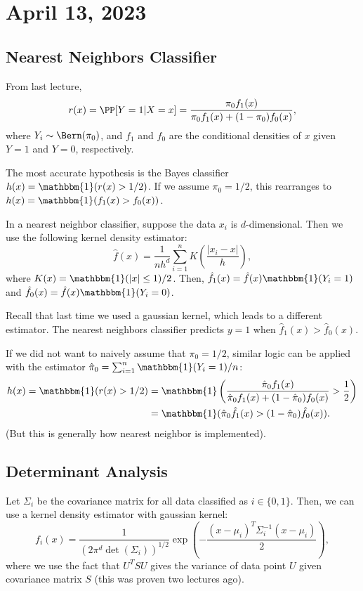 \section{April 13, 2023}

\subsection{Nearest Neighbors Classifier}

From last lecture, 
\[r(x) = \PP[Y=1|X=x] = \frac{\pi_0f_1(x)}{\pi_0f_1(x) + (1-\pi_0)f_0(x)},\]
where $Y_i\sim \Bern(\pi_0)$, and $f_1$ and $f_0$ are the conditional densities of $x$ given $Y=1$ and $Y=0$, respectively. 

The most accurate hypothesis is the Bayes classifier $h(x) = \mathbbm{1}(r(x) > 1/2)$. If we assume $\pi_0=1/2$, this rearranges to $h(x) = \mathbbm{1}(f_1(x) > f_0(x))$. 

\begin{definition}

In a nearest neighbor classifier, suppose the data $x_i$ is $d$-dimensional. Then we use the following kernel density estimator:
\[\hat{f}(x) = \frac{1}{nh^d}\sum_{i=1}^nK\left(\frac{\vert x_i-x\vert}{h}\right),\]
where $K(x) = \mathbbm{1}(\vert x\vert \leq 1)/2$. Then, $\hat{f}_1(x) = \hat{f}(x)\mathbbm{1}(Y_i=1)$ and $\hat{f}_0(x) = \hat{f}(x)\mathbbm{1}(Y_i=0)$. 
\end{definition}
Recall that last time we used a gaussian kernel, which leads to a different estimator. The nearest neighbors classifier predicts $y=1$ when $\hat{f}_1(x) > \hat{f}_0(x)$. 

If we did not want to naively assume that $\pi_0=1/2$, similar logic can be applied with the estimator $\hat{\pi}_0 = \sum_{i=1}^n\mathbbm{1}(Y_i=1)/n$:
\begin{align*}
    h(x) = \mathbbm{1}(r(x)>1/2) &= \mathbbm{1}\left(\frac{\hat{\pi}_0f_1(x)}{\hat{\pi}_0f_1(x) + (1-\hat{\pi}_0)f_0(x)} > \frac{1}{2}\right) \\
    &= \mathbbm{1}(\hat{\pi}_0\hat{f}_1(x) > (1-\hat{\pi}_0)\hat{f}_0(x)).
\end{align*}
(But this is generally how nearest neighbor is implemented). 

\subsection{Determinant Analysis}
Let $\Sigma_i$ be the covariance matrix for all data classified as $i\in \{0,1\}$. Then, we can use a kernel density estimator with gaussian kernel:
\[f_i(x) = \frac{1}{(2\pi^d\det(\Sigma_i))^{1/2}}\exp\left(-\frac{(x-\mu_i)^T\Sigma_i^{-1}(x-\mu_i)}{2}\right),\]
where we use the fact that $U^TSU$ gives the variance of data point $U$ given covariance matrix $S$ (this was proven two lectures ago). 

